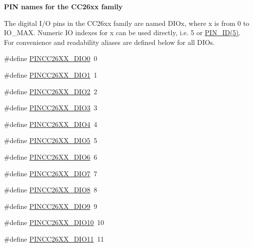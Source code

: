 \begin{Indent}{\bf P\+I\+N names for the C\+C26xx family}\par
{\em \label{_p_i_n_c_c26_x_x_8h_PINCC26XX_IONAMES}%
\hypertarget{_p_i_n_c_c26_x_x_8h_PINCC26XX_IONAMES}{}%


The digital I/\+O pins in the C\+C26xx family are named D\+I\+Ox, where x is from 0 to I\+O\+\_\+\+M\+A\+X. Numeric I\+O indexes for x can be used directly, i.\+e. 5 or \hyperlink{_p_i_n_8h_add47c82f7563d28053f76d368d344bc6}{P\+I\+N\+\_\+\+I\+D(5)}. For convenience and readability aliases are defined below for all D\+I\+Os. }\begin{DoxyCompactItemize}
\item 
\#define \hyperlink{_p_i_n_c_c26_x_x_8h_a34a392179279242211f40dc5e70a727f}{P\+I\+N\+C\+C26\+X\+X\+\_\+\+D\+I\+O0}~0
\item 
\#define \hyperlink{_p_i_n_c_c26_x_x_8h_a8c89bec12551b6168fa495a624e5e311}{P\+I\+N\+C\+C26\+X\+X\+\_\+\+D\+I\+O1}~1
\item 
\#define \hyperlink{_p_i_n_c_c26_x_x_8h_adce988906439086ebb744865f66cbbde}{P\+I\+N\+C\+C26\+X\+X\+\_\+\+D\+I\+O2}~2
\item 
\#define \hyperlink{_p_i_n_c_c26_x_x_8h_a25a6de3a42448c978e4426d45d53ffd9}{P\+I\+N\+C\+C26\+X\+X\+\_\+\+D\+I\+O3}~3
\item 
\#define \hyperlink{_p_i_n_c_c26_x_x_8h_a01b67a23d7f4b003e280d5b45dfe26e2}{P\+I\+N\+C\+C26\+X\+X\+\_\+\+D\+I\+O4}~4
\item 
\#define \hyperlink{_p_i_n_c_c26_x_x_8h_a954b1bfc19345d5df0011ec2d8a21c36}{P\+I\+N\+C\+C26\+X\+X\+\_\+\+D\+I\+O5}~5
\item 
\#define \hyperlink{_p_i_n_c_c26_x_x_8h_a0087796716ceb72a56adef9c4c2a5481}{P\+I\+N\+C\+C26\+X\+X\+\_\+\+D\+I\+O6}~6
\item 
\#define \hyperlink{_p_i_n_c_c26_x_x_8h_af646857e4e4b7bc34ccf0b6029071a4d}{P\+I\+N\+C\+C26\+X\+X\+\_\+\+D\+I\+O7}~7
\item 
\#define \hyperlink{_p_i_n_c_c26_x_x_8h_a2ea0010cfa2ff03ce27ff41ba113dfe3}{P\+I\+N\+C\+C26\+X\+X\+\_\+\+D\+I\+O8}~8
\item 
\#define \hyperlink{_p_i_n_c_c26_x_x_8h_aa21c44a220737e668b5f47d53948c91e}{P\+I\+N\+C\+C26\+X\+X\+\_\+\+D\+I\+O9}~9
\item 
\#define \hyperlink{_p_i_n_c_c26_x_x_8h_af2b5edf7bd5e09692bd588db69762718}{P\+I\+N\+C\+C26\+X\+X\+\_\+\+D\+I\+O10}~10
\item 
\#define \hyperlink{_p_i_n_c_c26_x_x_8h_a47dec0c44e437a1ee762a5ad65579711}{P\+I\+N\+C\+C26\+X\+X\+\_\+\+D\+I\+O11}~11

\end{DoxyCompactItemize}
\end{Indent}
